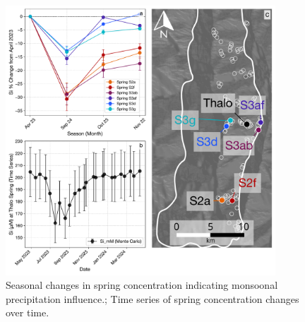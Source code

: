 \begin{figure}[h]
    \centering
    \includegraphics[width=0.9\textwidth]{Combined_Si_mM_Plots_with_Schematic.pdf}
    \caption{Seasonal changes in spring concentration indicating monsoonal precipitation influence.; Time series of spring concentration changes over time.}
    \label{fig:time_series_changes}
\end{figure}

\FloatBarrier























